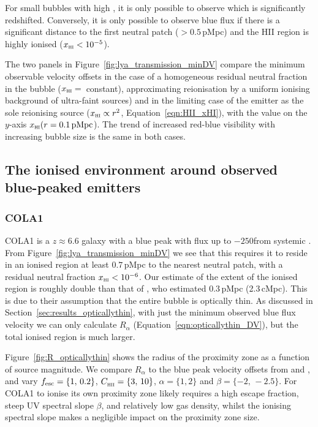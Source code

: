 \documentclass[fleqn,usenatbib]{mnras}
\begin{document}
For small bubbles with high \xHI, it is only possible to observe \lya which is significantly redshifted. Conversely, it is only possible to observe blue \lya flux if there is a significant distance to the first neutral patch ($>0.5$\,pMpc) and the HII region is highly ionised ($\xHI<10^{-5}$).

The two panels in Figure~\ref{fig:lya_transmission_minDV} compare the minimum observable \lya velocity offsets in the case of a homogeneous residual neutral fraction in the bubble ($\xHI =$\, constant), approximating reionisation by a uniform ionising background of ultra-faint sources) and in the limiting case of the \lya emitter as the sole reionising source ($\xHI \propto r^2$, Equation~\ref{eqn:HII_xHI}), with the value on the $y$-axis $\xHI(r=0.1\,\mathrm{pMpc}$). The trend of increased red-blue visibility with increasing bubble size is the same in both cases.

\subsection{The ionised environment around observed blue-peaked \lya emitters}
\label{sec:results_obs}

\subsubsection{COLA1}
\label{sec:results_obs_COLA1}

COLA1 is a $z \approx 6.6$ galaxy with a blue \lya peak with flux up to $-250$\kms from systemic \citep{Hu2016,Matthee2018b}. From Figure~\ref{fig:lya_transmission_minDV} we see that this requires it to reside in an ionised region at least $0.7$\,pMpc to the nearest neutral patch, with a residual neutral fraction $\xHI < 10^{-6}$. Our estimate of the extent of the ionised region is roughly double than that of \citet{Matthee2018b}, who estimated 0.3\,pMpc (2.3\,cMpc). This is due to their assumption that the entire bubble is optically thin. As discussed in Section~\ref{sec:results_opticallythin}, with just the minimum observed blue flux velocity we can only calculate $R_\alpha$ (Equation~\ref{eqn:opticallythin_DV}), but the total ionised region is much larger.

Figure~\ref{fig:R_opticallythin} shows the radius of the proximity zone as a function of source magnitude. We compare $R_\alpha$ to the blue peak velocity offsets from \citet{Matthee2018b} and \citet{Hashimoto2018a}, and vary $\fesc =\{1,\,0.2\}$, $\clump =\{3,\,10\}$, $\alpha =\{1,2\}$ and $\beta = \{-2,\,-2.5\}$. For COLA1 to ionise its own proximity zone likely requires a high escape fraction, steep UV spectral slope $\beta$, and relatively low gas density, whilst the ionising spectral slope makes a negligible impact on the proximity zone size.
\end{document}
